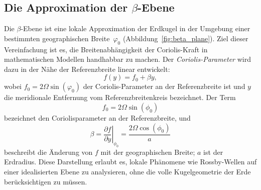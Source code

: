 \subsection{Die Approximation der \(\beta\)-Ebene }

Die \(\beta\)-Ebene ist eine lokale Approximation der Erdkugel in der Umgebung
einer bestimmten geographischen Breite~\(\varphi_0\)
(Abbildung~\ref{fig:beta_plane}). Ziel dieser Vereinfachung ist es, die
Breitenabhängigkeit der Coriolis-Kraft in mathematischen Modellen handhabbar zu
machen. Der \emph{Coriolis-Parameter} wird dazu in der Nähe der Referenzbreite linear
entwickelt:
\begin{equation}
	f(y) = f_0 + \beta y,
	\label{rossby:eq:beta_plane}
\end{equation}
wobei $f_0 = 2 \Omega \sin(\varphi_0)$ der Coriolis-Parameter an der
Referenzbreite ist und $y$ die meridionale Entfernung vom
Referenzbreitenkreis bezeichnet.
Der Term
\begin{equation}
	f_0 = 2\Omega \sin(\phi_0)
	\label{rossby:eq:coriolis_parameter_ref}
\end{equation}
bezeichnet den Coriolisparameter an der Referenzbreite, und
\begin{equation}
	\beta = \left.\frac{\partial f}{\partial y}\right|_{\phi_0} = \frac{2\Omega \cos(\phi_0)}{a}
	\label{rossby:eq:beta_parameter_ref}
\end{equation}
beschreibt die Änderung von $f$ mit der geographischen Breite; $a$ ist der
Erdradius. Diese Darstellung erlaubt es, lokale Phänomene wie Rossby-Wellen auf
einer idealisierten Ebene zu analysieren, ohne die volle Kugelgeometrie der
Erde berücksichtigen zu müssen.

